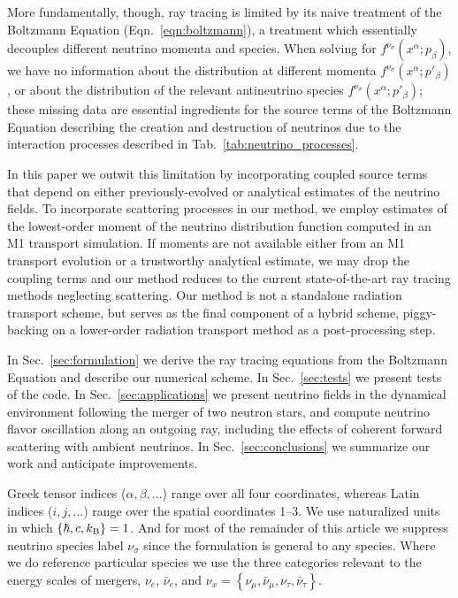 \documentclass[aps,floatfix,prd,superscriptaddress,twocolumn]{revtex4-1}
\begin{document}
More fundamentally, though, ray tracing is limited by its naive
treatment of the Boltzmann Equation (Eqn.~\ref{eqn:boltzmann}),
a treatment which essentially decouples different neutrino momenta and species.
When solving for $f^{\nu_\sigma}(x^\alpha;p_\beta)$,
we have no information about the distribution at different momenta
$f^{\nu_\sigma}(x^\alpha;p'_\beta)$,
or about the distribution of the relevant antineutrino species
$f^{\bar{\nu}_\sigma}(x^\alpha;p'_\beta)$;
these missing data are essential ingredients
for the source terms of the Boltzmann Equation describing the creation and
destruction of neutrinos due to the interaction processes described in
Tab.~\ref{tab:neutrino_processes}.

In this paper we outwit this limitation by incorporating coupled source terms
that depend on either previously-evolved or analytical
estimates of the neutrino fields.
To incorporate scattering processes in our method, we employ estimates of the
lowest-order moment of the neutrino distribution function
computed in an M1 transport simulation.
If moments are not available either from
an M1 transport evolution or a trustworthy analytical estimate,
we may drop the coupling terms and our method reduces to the current
state-of-the-art ray tracing methods neglecting scattering.
Our method is not a standalone radiation transport scheme,
but serves as the final component of a hybrid scheme,
piggy-backing on a lower-order radiation transport method as a
post-processing step.

In Sec.~\ref{sec:formulation} we derive the ray tracing equations from the
Boltzmann Equation and describe our numerical scheme.
In Sec.~\ref{sec:tests} we present tests of the code.
In Sec.~\ref{sec:applications} we present neutrino fields in
the dynamical environment following the merger of two neutron stars,
and compute neutrino flavor oscillation along an outgoing ray,
including the effects of coherent forward scattering with ambient neutrinos.
In Sec.~\ref{sec:conclusions} we summarize our work and anticipate improvements.

Greek tensor indices ($\alpha, \beta, ...$) range over all four coordinates,
whereas Latin indices ($i, j, ...$) range over the spatial coordinates 1--3.
We use naturalized units in which $\{\hbar,c,k_{\rm B}\}=1$.
And for most of the remainder of this article we suppress neutrino species label
$\nu_\sigma$ since the formulation is general to any species.
Where we do reference particular species we use the three categories
relevant to the energy scales of mergers, $\nu_e$, $\bar{\nu}_e$, and
$\nu_x=\left\{\nu_\mu,\bar{\nu}_\mu,\nu_\tau,\bar{\nu}_\tau\right\}$.
\end{document}

